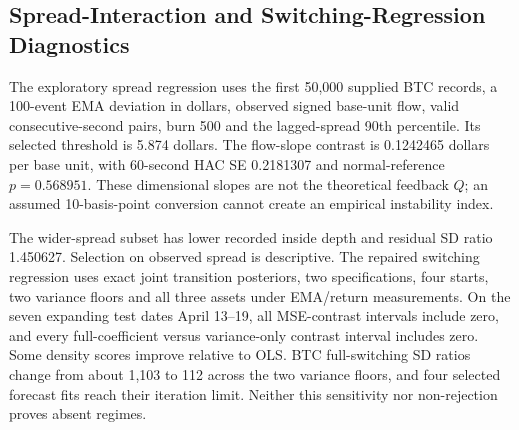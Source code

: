 \subsection{Spread-Interaction and Switching-Regression Diagnostics}
The exploratory spread regression uses the first 50,000 supplied BTC records, a 100-event EMA deviation in dollars, observed signed base-unit flow, valid consecutive-second pairs, burn 500 and the lagged-spread 90th percentile. Its selected threshold is 5.874 dollars. The flow-slope contrast is 0.1242465 dollars per base unit, with 60-second HAC SE 0.2181307 and normal-reference $p=0.568951$. These dimensional slopes are not the theoretical feedback $Q$; an assumed 10-basis-point conversion cannot create an empirical instability index.
\begin{table}[htbp]
\centering\footnotesize\setlength{\tabcolsep}{3pt}
\caption{Exploratory BTC spread-interaction regression on the first 50,000 supplied records, with 49,497 valid transitions after burn and gap filtering. Flow is signed base quantity; the slope has dollars per base unit and is not the dimensionless $Q$.}
\label{tab:threshold_var}
\end{table}

The wider-spread subset has lower recorded inside depth and residual SD ratio 1.450627. Selection on observed spread is descriptive. The repaired switching regression uses exact joint transition posteriors, two specifications, four starts, two variance floors and all three assets under EMA/return measurements. On the seven expanding test dates April 13--19, all MSE-contrast intervals include zero, and every full-coefficient versus variance-only contrast interval includes zero. Some density scores improve relative to OLS. BTC full-switching SD ratios change from about 1,103 to 112 across the two variance floors, and four selected forecast fits reach their iteration limit. Neither this sensitivity nor non-rejection proves absent regimes.

